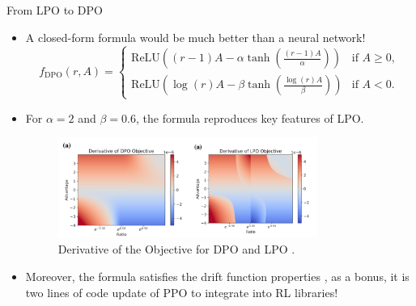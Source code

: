 \documentclass[9pt]{beamer}
\begin{document}
\begin{frame}{From LPO to DPO}

  \begin{itemize}
    \item A closed-form formula would be much better than a neural network!
    \begin{equation}
  f_{\text{DPO}}(r, A) = \begin{cases} 
    \text{ReLU}\left( (r - 1)A - \alpha \tanh\left(\frac{(r - 1)A}{\alpha}\right) \right) & \text{if } A \geq 0, \\
    \text{ReLU}\left( \log(r)A - \beta \tanh\left( \frac{\log(r)A}{\beta} \right) \right) & \text{if } A < 0.
  \end{cases}
\end{equation}
    \item For \( \alpha = 2 \) and \( \beta = 0.6 \), the formula reproduces key features of LPO.

  \begin{figure}
    \centering
    \includegraphics[width=0.8\textwidth]{figures/results2.png}
    \caption{Derivative of the Objective for DPO and LPO \cite{dpo2022}.}
    \label{fig:trl6}
  \end{figure}
  \pause
  
    \item Moreover, the formula satisfies the drift function properties \cite{dpo2022}, as a bonus, it is two lines of code update of PPO to integrate into RL libraries!
  \end{itemize}

\end{frame}
\end{document}
